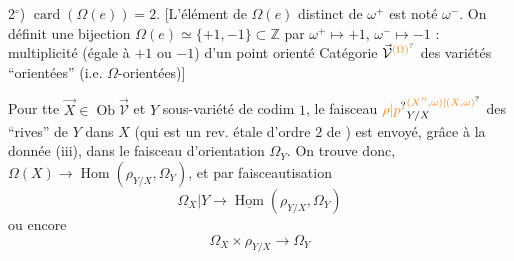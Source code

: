 2$^\circ$) $\operatorname{card}(\Omega(e))=2$. [L'élément de $\Omega(e)$ distinct de $\omega^+$ est noté $\omega^-$. On définit une bijection $\Omega(e)\simeq\{+1,-1\}\subset\mathbb Z$ par $\omega^+\mapsto+1$, $\omega^-\mapsto-1$ : multiplicité (égale à $+1$ ou $-1$) d'un point orienté Catégorie $\vec{\mathcal V}^{\unsure{(\Omega)}}$ des variétés  ``orientées'' (i.e. $\Omega$-orientées)]

 Pour tte $\vec X\in\operatorname{Ob}\vec{\mathcal V}$ et $Y$ sous-variété de codim $1$, le faisceau $\unsure{\rho|p}_{Y/X}^{\unsure{(X'',\omega)|(X,\omega)}}$ des ``rives'' de $Y$ dans $X$ (qui est un rev. étale d'ordre $2$ de ) est envoyé, grâce à la donnée (iii), dans le faisceau d'orientation $\Omega_Y$. On trouve donc,  $\Omega(X)\to\operatorname{Hom}(\rho_{Y/X},\Omega_Y)$, et par faisceautisation
\[
\Omega_X|Y\longrightarrow\underline{\operatorname{Hom}}(\rho_{Y/X},\Omega_Y)
\]
ou encore
\[
\Omega_X\times\rho_{Y/X}\longrightarrow\Omega_Y
\]
